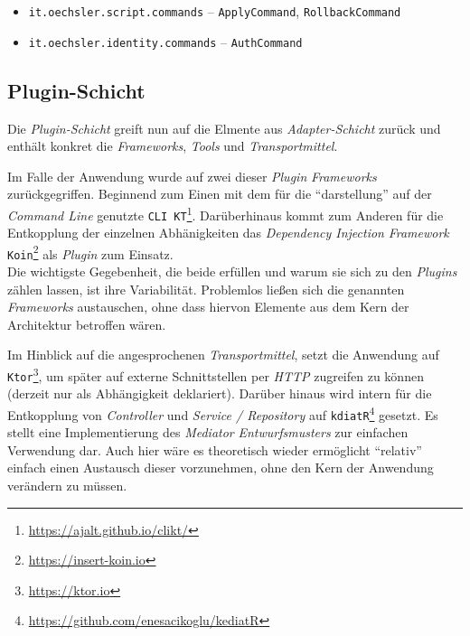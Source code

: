 \begin{itemize}
    \item \texttt{it.oechsler.script.commands} -- \texttt{ApplyCommand}, \texttt{RollbackCommand}
    \item \texttt{it.oechsler.identity.commands} -- \texttt{AuthCommand}
\end{itemize}

\subsection{Plugin-Schicht}
\label{subsec:plugin_schicht}

Die \emph{Plugin-Schicht} greift nun auf die Elmente aus \emph{Adapter-Schicht} zurück und enthält konkret die \emph{Frameworks}, \emph{Tools} und \emph{Transportmittel}.

Im Falle der Anwendung wurde auf zwei dieser \emph{Plugin} \emph{Frameworks} zurückgegriffen. 
Beginnend zum Einen mit dem für die \enquote{darstellung} auf der \emph{Command Line} genutzte \texttt{CLI~KT}\footnote{\url{https://ajalt.github.io/clikt/}}.
Darüberhinaus kommt zum Anderen für die Entkopplung der einzelnen Abhänigkeiten das \emph{Dependency Injection} \emph{Framework} \texttt{Koin}\footnote{\url{https://insert-koin.io}} als \emph{Plugin} zum Einsatz.\\
Die wichtigste Gegebenheit, die beide erfüllen und warum sie sich zu den \emph{Plugins} zählen lassen, ist ihre Variabilität.
Problemlos ließen sich die genannten \emph{Frameworks} austauschen, ohne dass hiervon Elemente aus dem Kern der Architektur betroffen wären.

Im Hinblick auf die angesprochenen \emph{Transportmittel}, setzt die Anwendung auf \texttt{Ktor}\footnote{\url{https://ktor.io}}, um später auf externe Schnittstellen per \emph{HTTP} zugreifen zu können (derzeit nur als Abhängigkeit deklariert).
Darüber hinaus wird intern für die Entkopplung von \emph{Controller} und \emph{Service / Repository} auf \texttt{kdiatR}\footnote{\url{https://github.com/enesacikoglu/kediatR}} gesetzt.
Es stellt eine Implementierung des \emph{Mediator} \emph{Entwurfsmusters} zur einfachen Verwendung dar.
Auch hier wäre es theoretisch wieder ermöglicht \enquote{relativ} einfach einen Austausch dieser vorzunehmen, ohne den Kern der Anwendung verändern zu müssen.

